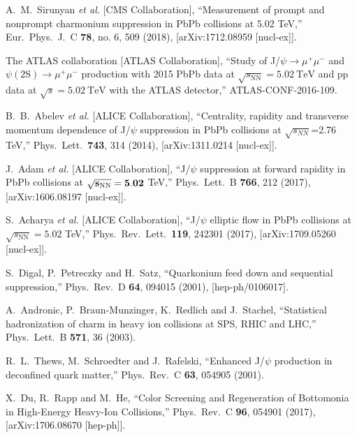 \documentclass[12pt,a4paper,final]{iopart} %
\begin{document}
\begin{thebibliography}{100}
  A.~M.~Sirunyan {\it et al.} [CMS Collaboration],
  ``Measurement of prompt and nonprompt charmonium suppression in PbPb collisions at 5.02 TeV,''
  Eur.\ Phys.\ J.\ C {\bf 78}, no. 6, 509 (2018),
  [arXiv:1712.08959 [nucl-ex]].



  The ATLAS collaboration [ATLAS Collaboration],
  ``Study of J/$\psi\to\mu^+\mu^-$ and $\psi\mathrm{(2S)}\to\mu^+\mu^-$ production with 2015 PbPb data at 
  $\sqrt{s_{\mathrm{NN}}} = 5.02~\mathrm {TeV}$ and pp data at $\sqrt{s} = 5.02~\mathrm {TeV}$ with the 
  ATLAS detector,'' ATLAS-CONF-2016-109.

  B.~B.~Abelev {\it et al.}  [ALICE Collaboration],
  ``Centrality, rapidity and transverse momentum dependence of J/$\psi$ suppression in PbPb collisions at $\sqrt{s_{NN}}$=2.76 TeV,''
  Phys.\ Lett.\  {\bf 743}, 314 (2014), [arXiv:1311.0214 [nucl-ex]].


  J.~Adam {\it et al.} [ALICE Collaboration],
  ``J/$\psi$ suppression at forward rapidity in PbPb collisions at $\mathbf{\sqrt{s_{{\rm NN}}} = 5.02}$ TeV,''
  Phys.\ Lett.\ B {\bf 766}, 212 (2017), [arXiv:1606.08197 [nucl-ex]].


  S.~Acharya {\it et al.} [ALICE Collaboration],
  ``J/$\psi$ elliptic flow in PbPb collisions at $\sqrt{s_\mathrm{NN}}=5.02$ TeV,''
  Phys.\ Rev.\ Lett.\  {\bf 119}, 242301 (2017),
  [arXiv:1709.05260 [nucl-ex]].


  S.~Digal, P.~Petreczky and H.~Satz,
  ``Quarkonium feed down and sequential suppression,''
  Phys.\ Rev.\ D {\bf 64}, 094015 (2001), [hep-ph/0106017].

  A.~Andronic, P.~Braun-Munzinger, K.~Redlich and J.~Stachel,
  ``Statistical hadronization of charm in heavy ion collisions at SPS, RHIC and LHC,''
  Phys.\ Lett.\ B {\bf 571}, 36 (2003).


  R.~L.~Thews, M.~Schroedter and J.~Rafelski,
  ``Enhanced J/$\psi$ production in deconfined quark matter,''
  Phys.\ Rev.\ C {\bf 63}, 054905 (2001).



  X.~Du, R.~Rapp and M.~He,
  ``Color Screening and Regeneration of Bottomonia in High-Energy Heavy-Ion Collisions,''
  Phys.\ Rev.\ C {\bf 96}, 054901 (2017), [arXiv:1706.08670 [hep-ph]].







\end{thebibliography}
\end{document}
